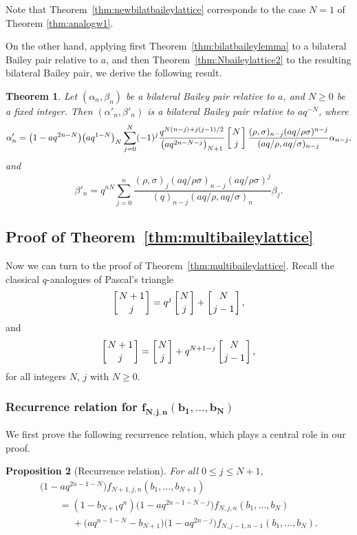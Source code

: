 \documentclass[pdftex]{sigma}
\numberwithin{equation}{section}
\newtheorem{Theorem}{Theorem}[section]
\newtheorem{Proposition}[Theorem]{Proposition}
 { \theoremstyle{definition}
\newtheorem{Definition}[Theorem]{Definition}
\newtheorem{Note}[Theorem]{Note}
\newtheorem{Example}[Theorem]{Example}
\newtheorem{Remark}[Theorem]{Remark} }
\begin{document}
Note that Theorem~\ref{thm:newbilatbaileylattice} corresponds to the case $N=1$ of Theorem \ref{thm:analogw1}.

On the other hand, applying first Theorem~\ref{thm:bilatbaileylemma} to a bilateral Bailey pair relative to $a$, and then Theorem~\ref{thm:Nbaileylattice2} to the resulting bilateral Bailey pair, we derive the following result.

\begin{Theorem}\label{thm:analogw2}
Let $(\alpha_n, \beta_n)$ be a bilateral Bailey pair relative to $a$, and $N\geq 0$ be a fixed integer. Then $(\alpha'_n, \beta'_n)$ is a bilateral Bailey pair relative to $aq^{-N}$, where
\begin{equation*}
\alpha'_n=\bigl(1-aq^{2n-N}\bigr)\bigl(aq^{1-N}\bigr)_N\sum_{j=0}^N(-1)^j\frac{q^{N(n-j)+j(j-1)/2}}{\bigl(aq^{2n-N-j}\bigr)_{N+1}}\left[{N\atop j}\right]\frac{(\rho,\sigma)_{n-j}(aq/\rho\sigma)^{n-j}}{
(aq/\rho,aq/\sigma)_{n-j}}\alpha_{n-j},
\end{equation*}
and
\begin{equation*}
\beta'_n=q^{nN}\sum_{j=0}^n\frac{(\rho,\sigma)_j(aq/\rho\sigma)_{n-j}(aq/\rho\sigma)^j}{(q)_{n-j}(aq/\rho,aq/\sigma)_n} \beta_j.
\end{equation*}
\end{Theorem}

\subsection[Proof of Theorem~\ref{thm:multibaileylattice}]{Proof of Theorem~\ref{thm:multibaileylattice}}

Now we can turn to the proof of Theorem~\ref{thm:multibaileylattice}.
Recall the classical $q$-analogues of Pascal's triangle
\begin{equation}\label{eq:pascal1}
\left[{N+1\atop j}\right] = q^j\left[{N\atop j}\right]+\left[{N\atop j-1}\right],
\end{equation}
and
\begin{equation} \label{eq:pascal2}
\left[{N+1\atop j}\right]=\left[{N\atop j}\right]+ q^{N+1-j}\left[{N\atop j-1}\right],
\end{equation}
for all integers $N$, $j$ with $N\geq 0$.

\subsubsection[Recurrence relation for f\_\{N,j,n\}(b\_1,...,b\_N)]{Recurrence relation for $\boldsymbol{f_{N,j,n}(b_1,\ldots,b_N)}$}
We first prove the following recurrence relation, which plays a central role in our proof.
\begin{Proposition}[Recurrence relation]\label{prop:rec} For all $0\leq j\leq N+1$,
\begin{gather*}
\bigl(1-aq^{2n-1-N}\bigr)f_{N+1,j,n}(b_1,\ldots,b_{N+1})\\
\qquad =(1-b_{N+1}q^n)\bigl(1-aq^{2n-1-N-j}\bigr)f_{N,j,n}(b_1,\ldots,b_N)\\
\phantom{\qquad =}{}+\bigl(aq^{n-1-N}-b_{N+1}\bigr)\bigl(1-aq^{2n-j}\bigr)f_{N,j-1,n-1}(b_1,\ldots,b_N).
\end{gather*}
\end{Proposition}
\end{document}

